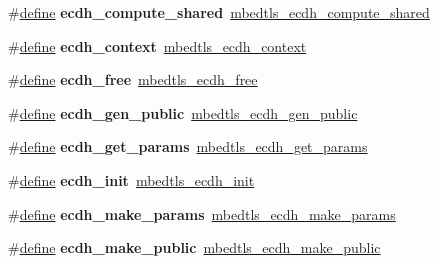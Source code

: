 \begin{DoxyCompactItemize}
\item 
\mbox{\label{compat-1_83_8h_a52728d6ec803314b48f913ec83b3020f}} 
\#\hyperlink{structdefine}{define} {\bfseries ecdh\+\_\+compute\+\_\+shared}~\hyperlink{ecdh_8h_aca0670e79f3002a218d6da8c8dee61e1}{mbedtls\+\_\+ecdh\+\_\+compute\+\_\+shared}
\item 
\mbox{\label{compat-1_83_8h_ac96cf479f0af593bef7a7e6606afe40b}} 
\#\hyperlink{structdefine}{define} {\bfseries ecdh\+\_\+context}~\hyperlink{structmbedtls__ecdh__context}{mbedtls\+\_\+ecdh\+\_\+context}
\item 
\mbox{\label{compat-1_83_8h_a0e480712779624cb15a5ce34dd2df9ea}} 
\#\hyperlink{structdefine}{define} {\bfseries ecdh\+\_\+free}~\hyperlink{ecdh_8h_a89cc40dc92fbbaf0275ea9a6184a5e71}{mbedtls\+\_\+ecdh\+\_\+free}
\item 
\mbox{\label{compat-1_83_8h_af79e065c82e29fe34b938d228e0573fb}} 
\#\hyperlink{structdefine}{define} {\bfseries ecdh\+\_\+gen\+\_\+public}~\hyperlink{ecdh_8h_a403a5d7363b6219a2017b837b665c354}{mbedtls\+\_\+ecdh\+\_\+gen\+\_\+public}
\item 
\mbox{\label{compat-1_83_8h_a810bcc80f67f9d1b4561450199cec821}} 
\#\hyperlink{structdefine}{define} {\bfseries ecdh\+\_\+get\+\_\+params}~\hyperlink{ecdh_8h_a3c03b82213c39abd90a5bd4b1646441d}{mbedtls\+\_\+ecdh\+\_\+get\+\_\+params}
\item 
\mbox{\label{compat-1_83_8h_a11517f4e7c635269211257451bfe36e1}} 
\#\hyperlink{structdefine}{define} {\bfseries ecdh\+\_\+init}~\hyperlink{ecdh_8h_a97e787a12f7aae180ab9828303199dca}{mbedtls\+\_\+ecdh\+\_\+init}
\item 
\mbox{\label{compat-1_83_8h_a4359d60d79e37303e5f7efaee296dcd4}} 
\#\hyperlink{structdefine}{define} {\bfseries ecdh\+\_\+make\+\_\+params}~\hyperlink{ecdh_8h_a784e56d5eea12e38374e9ce028692940}{mbedtls\+\_\+ecdh\+\_\+make\+\_\+params}
\item 
\mbox{\label{compat-1_83_8h_a8d824383a497cafad415facc16ad6dc7}} 
\#\hyperlink{structdefine}{define} {\bfseries ecdh\+\_\+make\+\_\+public}~\hyperlink{ecdh_8h_a417fd45ce78adb1b52027f995fa5ee57}{mbedtls\+\_\+ecdh\+\_\+make\+\_\+public}

\end{DoxyCompactItemize}

